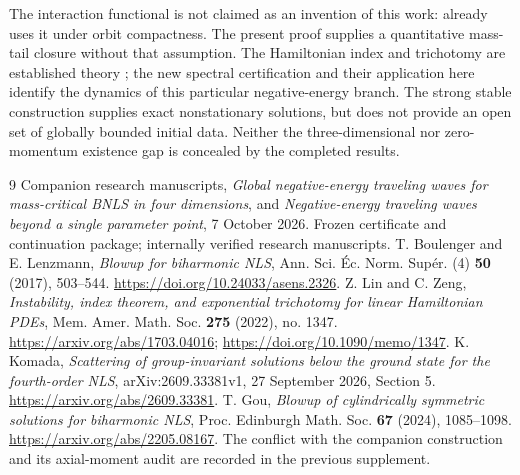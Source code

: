 \documentclass[11pt,a4paper]{article}
\theoremstyle{remark}\newtheorem{remark}[theorem]{Remark}
\begin{document}
The interaction functional is not claimed as an invention of this work: \cite{Komada} already uses it under orbit compactness. The present proof supplies a quantitative mass-tail closure without that assumption. The Hamiltonian index and trichotomy are established theory \cite{LZ}; the new spectral certification and their application here identify the dynamics of this particular negative-energy branch. The strong stable construction supplies exact nonstationary solutions, but does not provide an open set of globally bounded initial data. Neither the three-dimensional nor zero-momentum existence gap is concealed by the completed results.

\begin{thebibliography}{9}
 Companion research manuscripts, \emph{Global negative-energy traveling waves for mass-critical BNLS in four dimensions}, and \emph{Negative-energy traveling waves beyond a single parameter point}, 7 October 2026. Frozen certificate and continuation package; internally verified research manuscripts.
 T. Boulenger and E. Lenzmann, \emph{Blowup for biharmonic NLS}, Ann. Sci. \'Ec. Norm. Sup\'er. (4) \textbf{50} (2017), 503--544. \url{https://doi.org/10.24033/asens.2326}.
 Z. Lin and C. Zeng, \emph{Instability, index theorem, and exponential trichotomy for linear Hamiltonian PDEs}, Mem. Amer. Math. Soc. \textbf{275} (2022), no. 1347. \url{https://arxiv.org/abs/1703.04016}; \url{https://doi.org/10.1090/memo/1347}.
 K. Komada, \emph{Scattering of group-invariant solutions below the ground state for the fourth-order NLS}, arXiv:2609.33381v1, 27 September 2026, Section 5. \url{https://arxiv.org/abs/2609.33381}.
 T. Gou, \emph{Blowup of cylindrically symmetric solutions for biharmonic NLS}, Proc. Edinburgh Math. Soc. \textbf{67} (2024), 1085--1098. \url{https://arxiv.org/abs/2205.08167}. The conflict with the companion construction and its axial-moment audit are recorded in the previous supplement.
\end{thebibliography}
\end{document}
